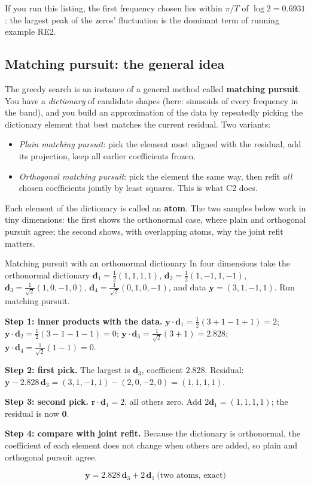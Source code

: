 If you run this listing, the first frequency chosen lies within $\pi/T$ of $\log2=0.6931$: the largest peak of the zeros' fluctuation is the dominant term of running example RE2.

\subsection{Matching pursuit: the general idea}

The greedy search is an instance of a general method called \textbf{matching pursuit}. You have a \emph{dictionary} of candidate shapes (here: sinusoids of every frequency in the band), and you build an approximation of the data by repeatedly picking the dictionary element that best matches the current residual. Two variants:
\begin{itemize}
\item \emph{Plain matching pursuit}: pick the element most aligned with the residual, add its projection, keep all earlier coefficients frozen.
\item \emph{Orthogonal matching pursuit}: pick the element the same way, then refit \emph{all} chosen coefficients jointly by least squares. This is what C2 does.
\end{itemize}
Each element of the dictionary is called an \textbf{atom}. The two samples below work in tiny dimensions: the first shows the orthonormal case, where plain and orthogonal pursuit agree; the second shows, with overlapping atoms, why the joint refit matters.

\begin{sample}{Matching pursuit with an orthonormal dictionary}
In four dimensions take the orthonormal dictionary $\bm d_1=\tfrac12(1,1,1,1)$, $\bm d_2=\tfrac12(1,-1,1,-1)$, $\bm d_3=\tfrac1{\sqrt2}(1,0,-1,0)$, $\bm d_4=\tfrac1{\sqrt2}(0,1,0,-1)$, and data $\bm y=(3,1,-1,1)$. Run matching pursuit.

\textbf{Step 1: inner products with the data.} $\bm y\cdot\bm d_1=\tfrac12(3+1-1+1)=2$; $\bm y\cdot\bm d_2=\tfrac12(3-1-1-1)=0$; $\bm y\cdot\bm d_3=\tfrac{1}{\sqrt2}(3+1)=2.828$; $\bm y\cdot\bm d_4=\tfrac1{\sqrt2}(1-1)=0$.

\textbf{Step 2: first pick.} The largest is $\bm d_3$, coefficient $2.828$. Residual: $\bm y-2.828\,\bm d_3=(3,1,-1,1)-(2,0,-2,0)=(1,1,1,1)$.

\textbf{Step 3: second pick.} $\bm r\cdot\bm d_1=2$, all others zero. Add $2\bm d_1=(1,1,1,1)$; the residual is now $\bm 0$.

\textbf{Step 4: compare with joint refit.} Because the dictionary is orthonormal, the coefficient of each element does not change when others are added, so plain and orthogonal pursuit agree.

$$\boxed{\bm y=2.828\,\bm d_3+2\,\bm d_1\ \text{(two atoms, exact)}}$$
\end{sample}

